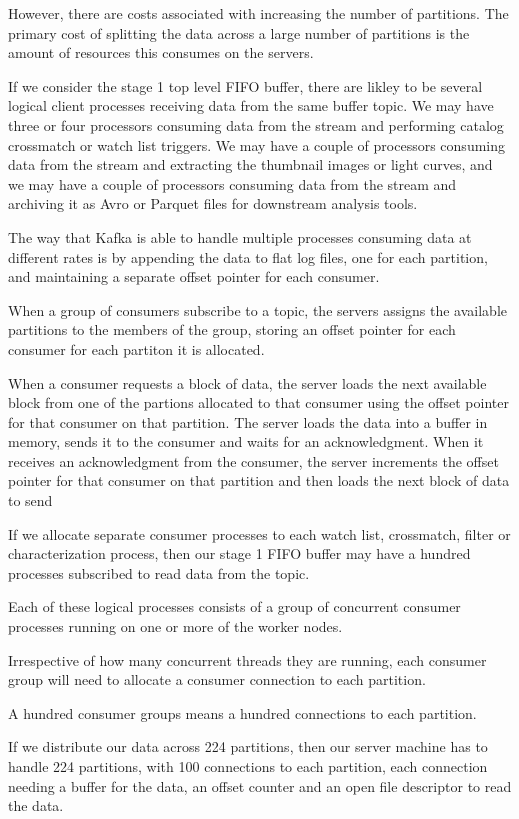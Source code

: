 \documentclass{article}
\newcommand{\crossmatch} {crossmatch\xspace}
\begin{document}
However, there are costs associated with increasing the number of partitions.
The primary cost of splitting the data across a large number of partitions is the amount of resources this consumes on the servers.

If we consider the stage 1 top level FIFO buffer, there are likley to be several logical client processes
receiving data from the same buffer topic.
We may have three or four processors consuming data from the stream and performing catalog \crossmatch or
watch list triggers.
We may have a couple of processors consuming data from the stream and extracting the thumbnail images or light curves, and we may have a couple of processors consuming data from the stream and archiving it as Avro or Parquet files for downstream analysis tools.

The way that Kafka is able to handle multiple processes consuming data at different rates is by appending the data to flat log files, one for each partition, and maintaining a separate offset pointer for each consumer.

When a group of consumers subscribe to a topic, the servers assigns the available partitions to the members of the group, storing an offset pointer for each consumer for each partiton it is allocated.

When a consumer requests a block of data, the server loads the next available block from one of the partions allocated to that consumer using the offset pointer for that consumer on that partition.
The server loads the data into a buffer in memory, sends it to the consumer and waits for an acknowledgment.
When it receives an acknowledgment from the consumer, the server increments the offset pointer for that consumer on that partition and then loads the next block of data to send

If we allocate separate consumer processes to each watch list, \crossmatch, filter or characterization process, then our stage 1 FIFO buffer may have a hundred processes subscribed to read data from the topic.

Each of these logical processes consists of a group of concurrent consumer processes running on one or more of the worker nodes.

Irrespective of how many concurrent threads they are running, each consumer group will need to allocate
a consumer connection to each partition.

A hundred consumer groups means a hundred connections to each partition.

If we distribute our data across 224 partitions, then our server machine has to handle 224 partitions, with 100 connections to each partition, each connection needing a buffer for the data, an offset counter and an open file descriptor to read the data.
\end{document}
